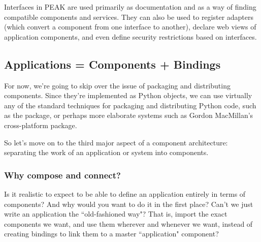 Interfaces in PEAK are used primarily as documentation and as a way of finding
compatible components and services.  They can also be used to register adapters
(which convert a component from one interface to another), declare web views of
application components, and even define security restrictions based on
interfaces.

\vfill
\begin{seealso}
\end{seealso}
\vfill
\subsection{Applications = Components + Bindings}

For now, we're going to skip over the issue of packaging and distributing
components.  Since they're implemented as Python objects, we can use virtually
any of the standard techniques for packaging and distributing Python code,
such as the  package, or perhaps more elaborate systems such
as Gordon MacMillan's cross-platform  package.

So let's move on to the third major aspect of a component architecture:
separating the work of an application or system into components.


\subsubsection{Why compose and connect?}

Is it realistic to expect to be able to define an application entirely in
terms of components?  And why would you want to do it in the first place?
Can't we just write an application the ``old-fashioned way"?  That is,
import the exact components we want, and use them wherever and whenever
we want, instead of creating bindings to link them to a master ``application"
component?

